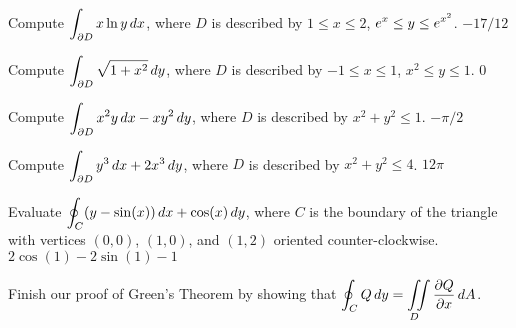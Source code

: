 \exercise Compute $\displaystyle\int_{\partial D} x\ln y\,dx$,
where $D$ is described by $1\le x\le 2$, $\displaystyle e^x\le y\le e^{x^2}$.
\answer $-17/12$
\endanswer
\endexercise

\exercise Compute $\displaystyle\int_{\partial D} \sqrt{1+x^2}\,dy$, 
where $D$ is described by $-1\le x\le 1$, $x^2\le y\le 1$.
\answer $0$
\endanswer
\endexercise

\exercise Compute $\displaystyle\int_{\partial D} x^2y\,dx - xy^2\,dy$, 
where $D$ is described by $x^2+y^2\le 1$.
\answer $-\pi/2$
\endanswer
\endexercise

\exercise Compute $\displaystyle\int_{\partial D} y^3\,dx + 2x^3\,dy$, 
where $D$ is described by $x^2+y^2\le 4$.
\answer $12\pi$
\endanswer

\endexercise

\exercise Evaluate $\displaystyle\oint_C (y-\sin(x))\,dx + \cos(x) \, dy$,
where $C$ is the boundary of the triangle with vertices $(0,0)$,
$(1,0)$, and $(1,2)$ oriented counter-clockwise.
\answer $2\cos(1)-2\sin(1)-1$
\endanswer
\endexercise

\exercise Finish our proof of Green's Theorem by showing that
$\ds\oint_C Q\,dy=\dint{D} {\partial Q\over\partial x}\,dA$.
\endexercise

\endexercises
